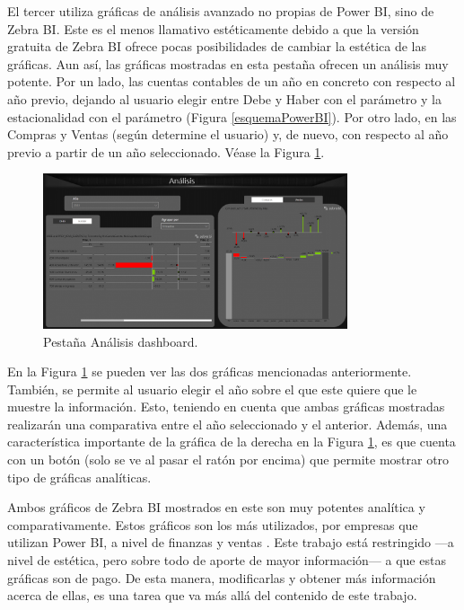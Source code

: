 El tercer  utiliza gráficas de análisis avanzado no propias de Power BI, sino de Zebra BI. Este  es el menos llamativo estéticamente debido a que la versión gratuita de Zebra BI ofrece pocas posibilidades de cambiar la estética de las gráficas. Aun así, las  gráficas mostradas en esta pestaña ofrecen un análisis muy potente. Por un lado, las cuentas contables de un año en concreto con respecto al año previo, dejando al usuario elegir entre Debe y Haber con el parámetro  y la estacionalidad con el parámetro  (Figura \ref{esquemaPowerBI}). Por otro lado, en las Compras y Ventas (según determine el usuario) y, de nuevo, con respecto al año previo a partir de un año seleccionado. Véase la Figura \ref{analisis}.

\begin{figure}[H]
	\centering
	\includegraphics[width= 0.8\textwidth]{imgs/analisis_dashboard}
	\caption{Pestaña Análisis dashboard.}
	\label{analisis}
\end{figure}

En la Figura \ref{analisis} se pueden ver las dos gráficas mencionadas anteriormente. También, se permite al usuario elegir el año sobre el que este quiere que le muestre la información. Esto, teniendo en cuenta que ambas gráficas mostradas realizarán una comparativa entre el año seleccionado y el anterior. Además, una característica importante de la gráfica de la derecha en la Figura \ref{analisis}, es que cuenta con un botón (solo se ve al pasar el ratón por encima) que permite mostrar otro tipo de gráficas analíticas.

Ambos gráficos de Zebra BI mostrados en este  son muy potentes analítica y comparativamente. Estos gráficos son los más  utilizados, por empresas que utilizan Power BI, a nivel de finanzas y ventas \parencite{zebraBI}. Este trabajo está restringido ---a nivel de estética, pero sobre todo de aporte de mayor información--- a que estas gráficas son de pago. De esta manera, modificarlas y obtener más información acerca de ellas, es una tarea que va más allá del contenido de este trabajo.

